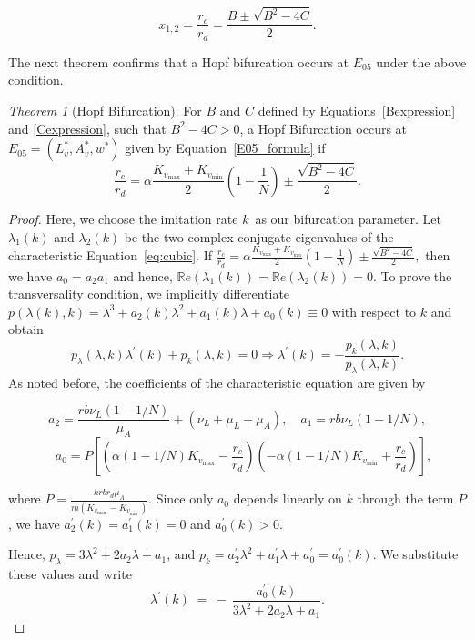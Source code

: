 \documentclass{article}
\theoremstyle{remark}
\theoremstyle{custom} %
\newtheorem{theorem}{Theorem}
\begin{document}
\[
x_{1,2} = \frac{r_c}{r_d} =  \frac{B \pm \sqrt{B^2 - 4C}}{2}.
\]

The next theorem confirms that a Hopf bifurcation occurs at $E_{05}$ under the above condition. 

\begin{theorem}[Hopf Bifurcation]
\label{hopf}
For \(B\) and \(C\) defined by Equations~\eqref{Bexpression} and \eqref{Cexpression}, such that \(B^2 - 4C> 0\), a Hopf Bifurcation occurs at \(E_{05}=\left(L_v^*, A_v^*, w^*\right)\) given by Equation~\eqref{E05_formula} if
\[
\frac{r_c}{r_d}
= \alpha \frac{K_{v_{\max}}+K_{v_{\min}}}{2}\left(1-\frac{1}{N}\right) 
\pm \frac{\sqrt{B^2-4C}}{2}.
\]

    
\end{theorem}


\begin{proof} 

Here, we choose the imitation rate \(k\,\) as our bifurcation parameter. Let \(\lambda_1(k)\) and \(\lambda_2(k)\) be the two complex conjugate eigenvalues of the characteristic Equation~\eqref{eq:cubic}. If \(\frac{r_c}{r_d}
= \alpha \frac{K_{v_{\max}}+K_{v_{\min}}}{2}\left(1-\frac{1}{N}\right) 
\pm \frac{\sqrt{B^2-4C}}{2},\) then we have \(a_0=a_2a_1\) and hence, \(\mathbb{R}e(\lambda_1(k))=\mathbb{R}e(\lambda_2(k))=0\).  To prove the transversality condition, we implicitly differentiate $p(\lambda(k), k)=\lambda^3+a_2(k) \lambda^2+a_1(k) \lambda+a_0(k) \equiv 0$ with respect to $k$ and obtain $$p_\lambda(\lambda, k) \lambda^{\prime}(k)+p_k(\lambda, k)=0 \Rightarrow \lambda^{\prime}(k)=-\frac{p_k(\lambda, k)}{p_\lambda(\lambda, k)}
.$$
As noted before, the coefficients of the characteristic equation are given by

$$
a_2=\frac{r b \nu_L(1-1 / N)}{\mu_A}+\left(\nu_L+\mu_L+\mu_A\right), \quad a_1=r b \nu_L(1-1 / N),$$ 
$$\quad a_0=P\left[\left(\alpha(1-1 / N) K_{v_{\max }}-\frac{r_c}{r_d}\right)\left(-\alpha(1-1 / N) K_{v_{\min }}+\frac{r_c}{r_d}\right)\right],
$$

where $P=\frac{k r b r_d \mu_A}{m\left(K_{v_{\text {max }}}-K_{v_{\text {min }}}\right)}$.
Since only $a_0$ depends linearly on $k$ through the term $P$, we have $a_2^{\prime}(k)=a_1^{\prime}(k)=0$ and $a_0^{\prime}(k) > 0$.

Hence, $p_\lambda=3 \lambda^2+2 a_2 \lambda+a_1$, and $p_k=a_2^{\prime} \lambda^2+a_1^{\prime} \lambda+a_0^{\prime}=a_0^{\prime}(k)$. We substitute these values and write
\begin{equation} 
\label{eq:lambda-derivative}
\lambda^{\prime}(k) \;=\; -\,\frac{ a_0^{\prime}(k)}
{3\lambda^2 + 2a_2 \lambda + a_1}.
\end{equation}





\end{proof}
\end{document}
